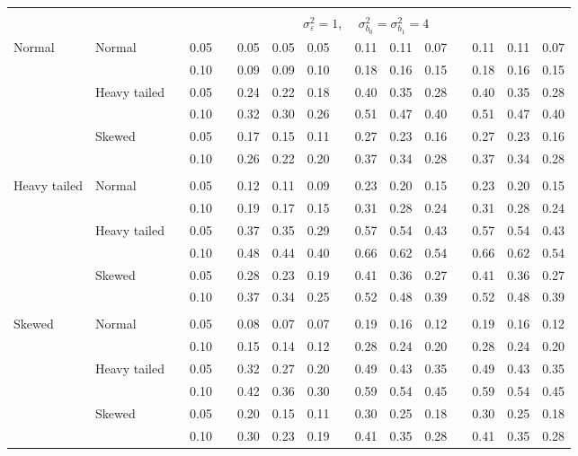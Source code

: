 \documentclass{article} %
\begin{document}
\begin{table}[ht]
\begin{scriptsize}
\begin{center}
\begin{tabular}{ll p{.1cm} c p{.1cm} rrr p{.1cm} rrr p{.1cm} rrr}
&&&&&&&&&&&&&&&\\
& && && \multicolumn{9}{c}{$\sigma_{\varepsilon}^2 = 1$, \ \ $\sigma_{b_0}^2 = \sigma_{b_1}^2 = 4$} \\ \cline{6-16}
Normal       & Normal       && 0.05 &&  0.05 & 0.05 & 0.05 && 0.11 & 0.11 & 0.07 && 0.11 & 0.11 & 0.07 \\ 
             &              && 0.10 &&  0.09 & 0.09 & 0.10 && 0.18 & 0.16 & 0.15 && 0.18 & 0.16 & 0.15 \\ 
             & Heavy tailed && 0.05 &&  0.24 & 0.22 & 0.18 && 0.40 & 0.35 & 0.28 && 0.40 & 0.35 & 0.28 \\ 
             &              && 0.10 &&  0.32 & 0.30 & 0.26 && 0.51 & 0.47 & 0.40 && 0.51 & 0.47 & 0.40 \\ 
             & Skewed       && 0.05 &&  0.17 & 0.15 & 0.11 && 0.27 & 0.23 & 0.16 && 0.27 & 0.23 & 0.16 \\ 
             &              && 0.10 &&  0.26 & 0.22 & 0.20 && 0.37 & 0.34 & 0.28 && 0.37 & 0.34 & 0.28 \\ 
             &&&&&&&&&&&&&&&\\
Heavy tailed & Normal       && 0.05 &&  0.12 & 0.11 & 0.09 && 0.23 & 0.20 & 0.15 && 0.23 & 0.20 & 0.15 \\ 
             &              && 0.10 &&  0.19 & 0.17 & 0.15 && 0.31 & 0.28 & 0.24 && 0.31 & 0.28 & 0.24 \\ 
             & Heavy tailed && 0.05 &&  0.37 & 0.35 & 0.29 && 0.57 & 0.54 & 0.43 && 0.57 & 0.54 & 0.43 \\ 
             &              && 0.10 &&  0.48 & 0.44 & 0.40 && 0.66 & 0.62 & 0.54 && 0.66 & 0.62 & 0.54 \\ 
             & Skewed       && 0.05 &&  0.28 & 0.23 & 0.19 && 0.41 & 0.36 & 0.27 && 0.41 & 0.36 & 0.27 \\ 
             &              && 0.10 &&  0.37 & 0.34 & 0.25 && 0.52 & 0.48 & 0.39 && 0.52 & 0.48 & 0.39 \\ 
             &&&&&&&&&&&&&&&\\
Skewed       & Normal       && 0.05 &&  0.08 & 0.07 & 0.07 && 0.19 & 0.16 & 0.12 && 0.19 & 0.16 & 0.12 \\ 
             &              && 0.10 &&  0.15 & 0.14 & 0.12 && 0.28 & 0.24 & 0.20 && 0.28 & 0.24 & 0.20 \\ 
             & Heavy tailed && 0.05 &&  0.32 & 0.27 & 0.20 && 0.49 & 0.43 & 0.35 && 0.49 & 0.43 & 0.35 \\ 
             &              && 0.10 &&  0.42 & 0.36 & 0.30 && 0.59 & 0.54 & 0.45 && 0.59 & 0.54 & 0.45 \\ 
             & Skewed       && 0.05 &&  0.20 & 0.15 & 0.11 && 0.30 & 0.25 & 0.18 && 0.30 & 0.25 & 0.18 \\ 
             &              && 0.10 &&  0.30 & 0.23 & 0.19 && 0.41 & 0.35 & 0.28 && 0.41 & 0.35 & 0.28 \\ 




\end{tabular}
\end{center}
\end{scriptsize}
\end{table}
\end{document}
